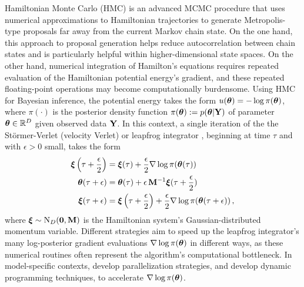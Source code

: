 \documentclass[12pt]{article} %
\begin{document}
Hamiltonian Monte Carlo (HMC) \citep{duane1987hybrid,neal2011mcmc} is an advanced MCMC procedure that uses numerical approximations to Hamiltonian trajectories to generate Metropolis-type \citep{metropolis1953equation} proposals far away from the current Markov chain state.  On the one hand, this approach to proposal generation helps reduce autocorrelation between chain states and is particularly helpful within higher-dimensional state spaces.  On the other hand, numerical integration of Hamilton's equations requires repeated evaluation of the Hamiltonian potential energy's gradient, and these repeated floating-point operations may become computationally burdensome.   Using HMC for Bayesian inference, the potential energy takes the form $u(\boldsymbol{\theta})=-\log \pi(\boldsymbol{\theta})$, where $\pi(\cdot)$ is the posterior density function $\pi(\boldsymbol{\theta}):=p(\boldsymbol{\theta}|\mathbf{Y})$ of parameter $\boldsymbol{\theta}\in\mathbb{R}^D$ given observed data $\mathbf{Y}$.  In this context, a single iteration of the the St\"{o}rmer-Verlet (velocity Verlet) or leapfrog integrator \citep{leimkuhler2004simulating}, beginning at time $\tau$ and with $\epsilon>0$ small, takes the form
\begin{align}\label{eq:leap}
	\boldsymbol{\xi}\left(\tau + \frac{\epsilon}{2}\right) &= \boldsymbol{\xi}(\tau) + \frac{\epsilon}{2} \nabla \log \pi(\boldsymbol{\theta}(\tau))  \\  \nonumber
	\boldsymbol{\theta}(\tau+\epsilon) &= \boldsymbol{\theta}(\tau) + \epsilon \, \mathbf{M}^{-1}\boldsymbol{\xi}(\tau+\frac{\epsilon}{2}) \\ \nonumber
	\boldsymbol{\xi}(\tau + \epsilon) &= \boldsymbol{\xi}\left(\tau+\frac{\epsilon}{2}\right) + \frac{\epsilon}{2} \nabla \log \pi(\boldsymbol{\theta}(\tau+\epsilon))  \, ,
\end{align}
where $\boldsymbol{\xi} \sim \mbox{N}_D(\boldsymbol{0},\mathbf{M})$ is the Hamiltonian system's Gaussian-distributed momentum variable.  
Different strategies aim to speed up the leapfrog integrator's many log-posterior gradient evaluations $\nabla \log \pi (\boldsymbol{\theta})$ in different ways, as these numerical routines often represent the algorithm's computational bottleneck.  In model-specific contexts, \citet{holbrook2021massive,holbrook2022bayesian,holbrook2022viral} develop parallelization strategies, and \citet{ji2020gradients} develop dynamic programming techniques, to accelerate $\nabla \log \pi (\boldsymbol{\theta})$.
\end{document}
